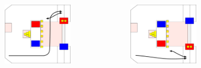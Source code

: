 \documentclass{beamer}
\begin{document}
\begin{frame}
\begin{columns}
\begin{figure}
  \end{figure}
  \begin{figure}
   \includegraphics[scale=0.15]{assets/paths/30_LL}
  \end{figure}
  \begin{figure}
   \includegraphics[scale=0.15]{assets/paths/30_RR}
  \end{figure}
 \end{columns}
\end{frame}
\end{document}
